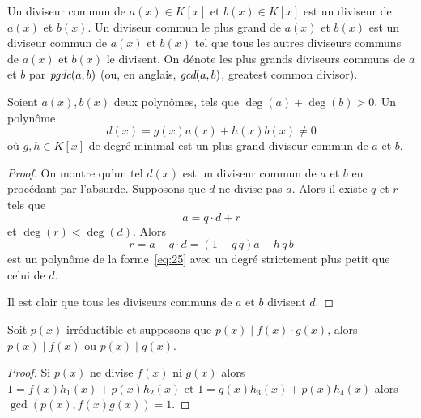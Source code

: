\begin{definition}
  \label{def:33}
  Un diviseur commun de $a(x) \in K[x]$
  et $b(x) \in K[x]$
  est un diviseur de $a(x)$
  et $b(x)$.
  Un diviseur commun le plus grand de $a(x)$
  et $b(x)$
  est un diviseur commun de $a(x)$
  et $b(x)$
  tel que tous les autres  diviseurs communs de $a(x)$ et $b(x)$ le divisent. On dénote les plus grands diviseurs communs de $a$ et $b$ par $\emph{pgdc}(a,b)$ (ou, en anglais, $\emph{gcd}(a,b)$, greatest common divisor).
\end{definition}


\begin{theorem}
  \label{thr:36}
  Soient $a(x),b(x)$ deux polynômes, tels que $\deg(a)+\deg(b)>0$. Un polynôme 
  \begin{equation}
    \label{eq:25}   
    d(x) = g(x) a(x) + h(x) b(x) \neq 0
  \end{equation}
  où $g,h \in K[x]$ 
  de degré minimal est un plus grand diviseur commun de $a$ et $b$. 
\end{theorem}

\begin{proof}
  On montre qu'un tel $d(x)$ est un diviseur commun de $a$ et $b$ en procédant par l'absurde. Supposons que $d$ ne divise pas $a$. Alors il existe $q$ et $r$ tels que 
  \begin{displaymath}
    a = q\cdot d +r 
  \end{displaymath}
et $\deg(r) < \deg(d)$. Alors 
\begin{displaymath}
  r = a - q\cdot d = (1 - g\,q) a - h\,q\,b
\end{displaymath}
est un polynôme de la forme~\eqref{eq:25} avec un degré strictement plus petit que celui de $d$. 

Il est clair que tous les diviseurs communs de $a$ et $b$ divisent $d$. 
\end{proof}




\begin{theorem}
  \label{thr:39}
  Soit $p(x)$ irréductible et supposons que $p(x) \mid f(x) \cdot  g(x)$, alors $p(x)\mid f(x)$ ou $p(x) \mid g(x)$. 
\end{theorem}

\begin{proof}
Si $p(x)$ ne divise $f(x)$ ni $g(x)$ alors $1 = f(x) h_1(x) + p(x)h_2(x)$ et 
$1 = g(x) h_3(x) + p(x) h_4(x)$ alors $\gcd(p(x), f(x)g(x))=1$. 
\end{proof}


